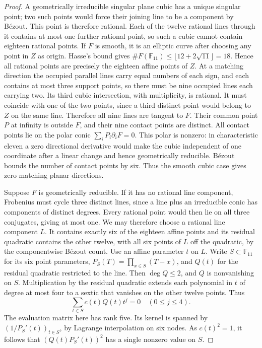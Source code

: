 \documentclass[11pt]{article}
\begin{document}
\begin{proof}
A geometrically irreducible singular plane cubic has a unique singular point; two such points would force their joining line to be a component by B\'ezout. This point is therefore rational. Each of the twelve rational lines through it contains at most one further rational point, so such a cubic cannot contain eighteen rational points. If $F$ is smooth, it is an elliptic curve after choosing any point in $Z$ as origin. Hasse's bound gives $\#F(\mathbb F_{11})\le\lfloor12+2\sqrt{11}\rfloor=18$. Hence all rational points are precisely the eighteen affine points of $Z$. At a matching direction the occupied parallel lines carry equal numbers of each sign, and each contains at most three support points, so there must be nine occupied lines each carrying two. Its third cubic intersection, with multiplicity, is rational. It must coincide with one of the two points, since a third distinct point would belong to $Z$ on the same line. Therefore all nine lines are tangent to $F$. Their common point $P$ at infinity is outside $F$, and their nine contact points are distinct. All contact points lie on the polar conic $\sum_i P_i \partial_iF=0$. This polar is nonzero: in characteristic eleven a zero directional derivative would make the cubic independent of one coordinate after a linear change and hence geometrically reducible. B\'ezout bounds the number of contact points by six. Thus the smooth cubic case gives zero matching planar directions.

Suppose $F$ is geometrically reducible. If it has no rational line component, Frobenius must cycle three distinct lines, since a line plus an irreducible conic has components of distinct degrees. Every rational point would then lie on all three conjugates, giving at most one. We may therefore choose a rational line component $L$. It contains exactly six of the eighteen affine points and its residual quadratic contains the other twelve, with all six points of $L$ off the quadratic, by the componentwise B\'ezout count. Use an affine parameter $t$ on $L$. Write $S\subset\mathbb F_{11}$ for its six point parameters, $P_S(T)=\prod_{x\in S}(T-x)$, and $Q(t)$ for the residual quadratic restricted to the line. Then $\deg Q\le2$, and $Q$ is nonvanishing on $S$. Multiplication by the residual quadratic extends each polynomial in $t$ of degree at most four to a sextic that vanishes on the other twelve points. Thus
\[
    \sum_{t\in S}c(t)Q(t)t^j=0\quad(0\le j\le4).
\]
The evaluation matrix here has rank five. Its kernel is spanned by $(1/P_S'(t))_{t\in S}$, by Lagrange interpolation on six nodes. As $c(t)^2=1$, it follows that $(Q(t)P_S'(t))^2$ has a single nonzero value on $S$.


\end{proof}
\end{document}
